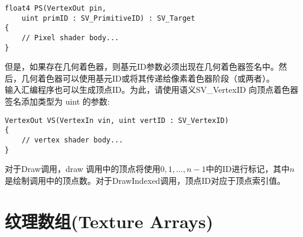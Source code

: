 \begin{lstlisting}
float4 PS(VertexOut pin, 
    uint primID : SV_PrimitiveID) : SV_Target
{
    // Pixel shader body...
}
\end{lstlisting}

\begin{flushleft}
但是，如果存在几何着色器，则基元ID参数必须出现在几何着色器签名中。然后，几何着色器可以使用基元ID或将其传递给像素着色器阶段（或两者）。\\

输入汇编程序也可以生成顶点ID。为此，请使用语义SV\_VertexID 向顶点着色器签名添加类型为 uint 的参数:\\
\end{flushleft}

\begin{lstlisting}
VertexOut VS(VertexIn vin, uint vertID : SV_VertexID)
{
    // vertex shader body...
}
\end{lstlisting}

\begin{flushleft}
对于Draw调用，draw 调用中的顶点将使用$0,1,...,n-1$中的ID进行标记，其中$n$是绘制调用中的顶点数。对于DrawIndexed调用，顶点ID对应于顶点索引值。\\
\end{flushleft}

\section{纹理数组(Texture Arrays)}





